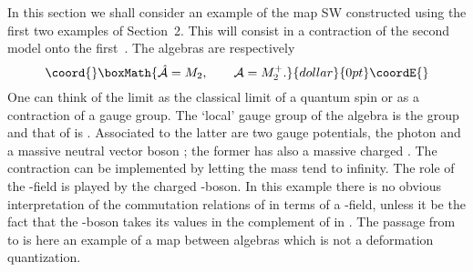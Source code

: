 \documentclass[a4paper,12pt]{article}
\def\h#1{\hat #1}
\def\c#1{{\cal #1}}
\begin{document}
In this section we shall consider an example of the map SW constructed
using the first two examples of Section~2. This will consist in a
contraction of the second model onto the first~\cite{MadMouSit97}.
The algebras are respectively 
$$\coord{}\boxMath{
\h{\c{A}} = M_2, \qquad \c{A} = M^+_2.
}{dollar}{0pt}\coordE{}$$
One can think of the limit as the classical limit of a quantum spin
or as a contraction of a gauge group.  The `local' gauge group of the
algebra \coordHE{} is the group \coordHE{} and that of \coordHE{} is 
\coordHE{}.  Associated to the latter are two gauge potentials,
the photon \myHighlight{$\gamma$}\coordHE{} and a massive neutral vector boson \coordHE{}; the
former has also a massive charged \coordHE{}.  The contraction can be
implemented by letting the \coordHE{} mass tend to infinity.  The role of the
\coordHE{}-field is played by the charged \coordHE{}-boson. In this example there is
no obvious interpretation of the commutation relations of \myHighlight{$\h{\c{A}}$}\coordHE{}
in terms of a \coordHE{}-field, unless it be the fact that the \coordHE{}-boson
takes its values in the complement of \coordHE{} in \coordHE{}.  The
passage from \myHighlight{$\c{A}$}\coordHE{} to \myHighlight{$\h{\c{A}}$}\coordHE{} is here an example of a map
between algebras which is not a deformation quantization.
\end{document}

